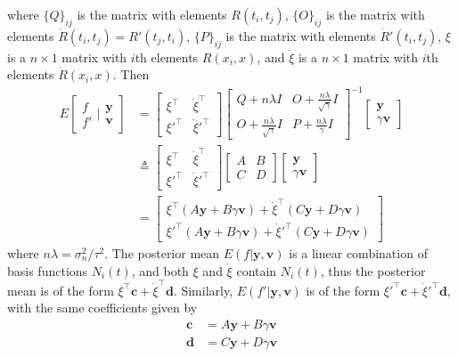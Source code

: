 where $\{Q\}_{ij}$ is the matrix with elements $R(t_i,t_j)$,  $\{O\}_{ij}$ is the matrix with elements $\dot{R}(t_i,t_j)=R'(t_j,t_i)$,  $\{P\}_{ij}$ is the matrix with elements $\dot{R}'(t_i,t_j)$, $\xi$ is a $n \times 1$ matrix with $i$th elements $R(x_i,x)$, and $\dot{\xi}$ is a $n \times 1$ matrix with $i$th elements $\dot{R}(x_i,x)$. Then
\begin{equation}
\begin{split}
E\left[ \begin{matrix}
f \\
f'
\end{matrix} | \begin{matrix}
\mathbf{y} \\
\mathbf{v}
\end{matrix}\right] &= 
\left[ \begin{matrix}
\xi^\top& \dot{\xi}^\top \\
\xi'^\top & \dot{\xi}'^\top 
\end{matrix} \right] 
\left[ \begin{matrix}
Q+n\lambda I & O+\frac{n\lambda}{\sqrt{\gamma}}I\\
 O+\frac{n\lambda}{\sqrt{\gamma}}I &  P+\frac{n\lambda}{\gamma}I
\end{matrix} \right]^{-1}
\left[ 
\begin{matrix}
\mathbf{y} \\
\gamma \mathbf{v}
\end{matrix} \right] \\
&\triangleq
\left[ \begin{matrix}
\xi^\top& \dot{\xi}^\top \\
\xi'^\top & \dot{\xi}'^\top 
\end{matrix} \right] 
\left[ \begin{matrix}
A & B\\
C & D
\end{matrix} \right]
\left[ 
\begin{matrix}
\mathbf{y} \\
\gamma \mathbf{v}
\end{matrix} \right] \\
&=
\left[ \begin{matrix}
\xi^\top(A\mathbf{y}+B\gamma \mathbf{v})+ \dot{\xi}^\top(C\mathbf{y}+D\gamma \mathbf{v}) \\
\xi'^\top(A\mathbf{y}+B\gamma \mathbf{v})+ \dot{\xi}'^\top(C\mathbf{y}+D\gamma \mathbf{v}) 
\end{matrix} \right] 
\end{split}
\end{equation}
where $n\lambda = \sigma_n^2 / \tau^2$. The posterior mean $E(f | \mathbf{y},\mathbf{v})$ is a linear combination of basis functions $N_i(t)$, and both $\xi$ and $\dot{\xi}$ contain $N_i(t)$, thus the posterior mean is of the form $\xi^\top \mathbf{c}+\dot{\xi}^\top\mathbf{d}$. Similarly, $E(f' | \mathbf{y},\mathbf{v})$ is of the form $\xi'^\top \mathbf{c}+\dot{\xi}'^\top\mathbf{d}$, with the same coefficients given by
\begin{align}
\mathbf{c}&=A\mathbf{y}+B\gamma \mathbf{v}\\
\mathbf{d}&=C\mathbf{y}+D\gamma \mathbf{v} 
\end{align}


